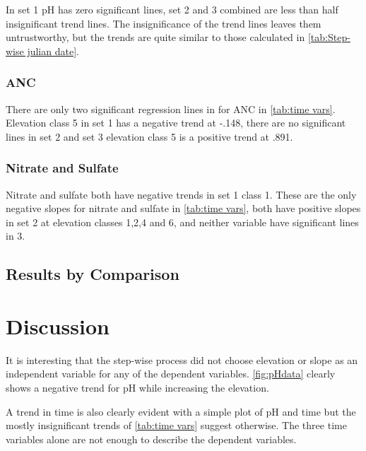 In set 1 pH has zero significant lines, set 2 and 3 combined are less than half insignificant trend lines.  The insignificance of the trend lines leaves them untrustworthy, but the trends are quite similar to those calculated in \autoref{tab:Step-wise julian date}.

\subsubsection{ANC}

There are only two significant regression lines in for ANC in \autoref{tab:time vars}.  Elevation class 5 in set 1 has a negative trend at -.148, there are no significant lines in set 2 and set 3 elevation class 5 is a positive trend at .891.  

\subsubsection{Nitrate and Sulfate}

Nitrate and sulfate both have negative trends in set 1 class 1.  These are the only negative slopes for nitrate and sulfate in \autoref{tab:time vars}, both have positive slopes in set 2 at elevation classes 1,2,4 and 6, and neither variable have significant lines in 3.

\subsection{Results by Comparison}

\section{Discussion}%

It is interesting that the step-wise process did not choose elevation or slope as an independent variable for any of the dependent variables.  \autoref{fig:pHdata} clearly shows a negative trend for pH while increasing the elevation.  %

A trend in time is also clearly evident with a simple plot of pH and time but the mostly insignificant trends of \autoref{tab:time vars} suggest otherwise.  The three time variables alone are not enough to describe the dependent variables.

